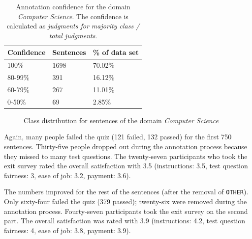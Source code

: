 \begin{table}[h]
\caption{Annotation confidence for the domain \emph{Computer Science}. The confidence is calculated as \emph{judgments for majority class / total judgments}. }
\label{fig:compsci_agg}
\begin{tabularx}{\textwidth}{XXX}
\toprule
Confidence & Sentences & \% of data set \\
\midrule
100\%	&	1698	&	70.02\%	 \\ 
80-99\%	&	391	&	16.12\%	 \\ 
60-79\%	&	267	&	11.01\%	 \\ 
0-50\%	&	69	&	2.85\%	 \\ 
\bottomrule
\end{tabularx}
\end{table}
\begin{figure}[h]
\centering
\caption{Class distribution for sentences of the domain \emph{Computer Science}}
\label{fig:compsci_fin}
\end{figure}

Again, many people failed the quiz (121 failed, 132 passed) for the first 750 sentences. Thirty-five people dropped out during the annotation process because they missed to many test questions. The twenty-seven participants who took the exit survey rated the overall satisfaction with 3.5 (instructions: 3.5, test question fairness: 3, ease of job: 3.2, payment: 3.6).

The numbers improved for the rest of the sentences (after the removal of \texttt{OTHER}). Only sixty-four failed the quiz (379 passed); twenty-six were removed during the annotation process. Fourty-seven participants took the exit survey on the second part. The overall satisfaction was rated with 3.9 (instructions: 4.2, test question fairness: 4, ease of job: 3.8, payment: 3.9).

